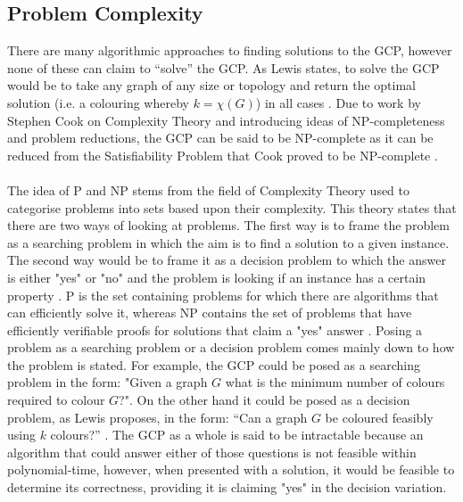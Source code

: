 \subsection{Problem Complexity}
There are many algorithmic approaches to finding solutions to the GCP, however none of these can claim to “solve” the GCP. As Lewis states, to solve the GCP would be to take any graph of any size or topology and return the optimal solution (i.e. a colouring whereby $k = \chi(G)$) in all cases \cite{LewisR.M.R2015AGtG}. Due to work by Stephen Cook on Complexity Theory and introducing ideas of NP-completeness and problem reductions, the GCP can be said to be NP-complete as it can be reduced from the Satisfiability Problem that Cook proved to be NP-complete \cite{Cook1971}. 
\\\\
The idea of P and NP stems from the field of Complexity Theory used to categorise problems into sets based upon their complexity. This theory states that there are two ways of looking at problems. The first way is to frame the problem as a searching problem in which the aim is to find a solution to a given instance. The second way would be to frame it as a decision problem to which the answer is either "yes" or "no" and the problem is looking if an instance has a certain property \cite{Goldreich_2010}. P is the set containing problems for which there are algorithms that can efficiently solve it, whereas NP contains the set of problems that have efficiently verifiable proofs for solutions that claim a "yes" answer \cite{Goldreich_2010, LewisR.M.R2015AGtG}. Posing a problem as a searching problem or a decision problem comes mainly down to how the problem is stated. For example, the GCP could be posed as a searching problem in the form: "Given a graph $G$ what is the minimum number of colours required to colour $G$?". On the other hand it could be posed as a decision problem, as Lewis proposes, in the form: “Can a graph $G$ be coloured feasibly using $k$ colours?” \cite{LewisR.M.R2015AGtG}. The GCP as a whole is said to be intractable because an algorithm that could answer either of those questions is not feasible within polynomial-time, however, when presented with a solution, it would be feasible to determine its correctness, providing it is claiming "yes" in the decision variation. 
\\\\
